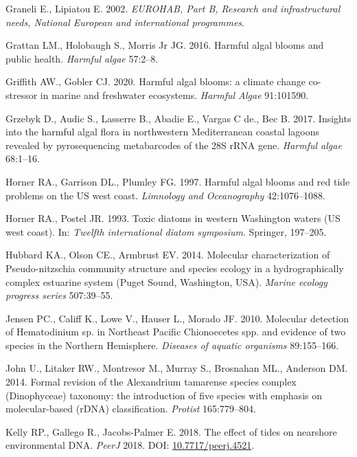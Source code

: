 \documentclass[
]{article}
\begin{document}
\leavevmode\hypertarget{ref-Graneli2002}{}%
Graneli E., Lipiatou E. 2002. \emph{EUROHAB, Part B, Research and
infrastructural needs, National European and international programmes}.

\leavevmode\hypertarget{ref-grattan2016harmful}{}%
Grattan LM., Holobaugh S., Morris Jr JG. 2016. Harmful algal blooms and
public health. \emph{Harmful algae} 57:2--8.

\leavevmode\hypertarget{ref-griffith2020harmful}{}%
Griffith AW., Gobler CJ. 2020. Harmful algal blooms: a climate change
co-stressor in marine and freshwater ecosystems. \emph{Harmful Algae}
91:101590.

\leavevmode\hypertarget{ref-grzebyk2017insights}{}%
Grzebyk D., Audic S., Lasserre B., Abadie E., Vargas C de., Bec B. 2017.
Insights into the harmful algal flora in northwestern Mediterranean
coastal lagoons revealed by pyrosequencing metabarcodes of the 28S rRNA
gene. \emph{Harmful algae} 68:1--16.

\leavevmode\hypertarget{ref-horner1997harmful}{}%
Horner RA., Garrison DL., Plumley FG. 1997. Harmful algal blooms and red
tide problems on the US west coast. \emph{Limnology and Oceanography}
42:1076--1088.

\leavevmode\hypertarget{ref-horner1993toxic}{}%
Horner RA., Postel JR. 1993. Toxic diatoms in western Washington waters
(US west coast). In: \emph{Twelfth international diatom symposium}.
Springer, 197--205.

\leavevmode\hypertarget{ref-hubbard2014molecular}{}%
Hubbard KA., Olson CE., Armbrust EV. 2014. Molecular characterization of
Pseudo-nitzschia community structure and species ecology in a
hydrographically complex estuarine system (Puget Sound, Washington,
USA). \emph{Marine ecology progress series} 507:39--55.

\leavevmode\hypertarget{ref-jensen2010molecular}{}%
Jensen PC., Califf K., Lowe V., Hauser L., Morado JF. 2010. Molecular
detection of Hematodinium sp. in Northeast Pacific Chionoecetes spp. and
evidence of two species in the Northern Hemisphere. \emph{Diseases of
aquatic organisms} 89:155--166.

\leavevmode\hypertarget{ref-John2014formal}{}%
John U., Litaker RW., Montresor M., Murray S., Brosnahan ML., Anderson
DM. 2014. Formal revision of the Alexandrium tamarense species complex
(Dinophyceae) taxonomy: the introduction of five species with emphasis
on molecular-based (rDNA) classification. \emph{Protist} 165:779--804.

\leavevmode\hypertarget{ref-kelly2018effect}{}%
Kelly RP., Gallego R., Jacobs-Palmer E. 2018. The effect of tides on
nearshore environmental DNA. \emph{PeerJ} 2018. DOI:
\href{https://doi.org/10.7717/peerj.4521}{10.7717/peerj.4521}.
\end{document}

